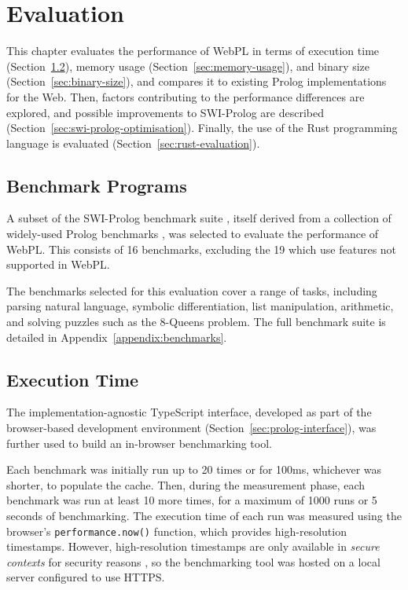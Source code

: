
\chapter{Evaluation}

This chapter evaluates the performance of WebPL in terms of execution time (Section~\ref{sec:execution-time}), memory usage (Section~\ref{sec:memory-usage}), and binary size (Section~\ref{sec:binary-size}), and compares it to existing Prolog implementations for the Web. Then, factors contributing to the performance differences are explored, and possible improvements to SWI-Prolog are described (Section~\ref{sec:swi-prolog-optimisation}). Finally, the use of the Rust programming language is evaluated (Section~\ref{sec:rust-evaluation}).

\section{Benchmark Programs}

A subset of the SWI-Prolog benchmark suite \cite{wielemakerSWIPrologbenchmarksuite2010}, itself derived from a collection of widely-used Prolog benchmarks \cite{haygoodPrologBenchmarkSuite1989}, was selected to evaluate the performance of WebPL. This consists of 16 benchmarks, excluding the 19 which use features not supported in WebPL.

The benchmarks selected for this evaluation cover a range of tasks, including parsing natural language, symbolic differentiation, list manipulation, arithmetic, and solving puzzles such as the 8-Queens problem. The full benchmark suite is detailed in Appendix~\ref{appendix:benchmarks}.

\section{Execution Time}

\label{sec:execution-time}

The implementation-agnostic TypeScript interface, developed as part of the browser-based development environment (Section~\ref{sec:prolog-interface}), was further used to build an in-browser benchmarking tool.

Each benchmark was initially run up to 20 times or for 100ms, whichever was shorter, to populate the cache. Then, during the measurement phase, each benchmark was run at least 10 more times, for a maximum of 1000 runs or 5 seconds of benchmarking. The execution time of each run was measured using the browser's \texttt{performance.now()} function, which provides high-resolution timestamps. However, high-resolution timestamps are only available in \emph{secure contexts} for security reasons \cite{sanchez-rolaClockClockTimeBased2018}, so the benchmarking tool was hosted on a local server configured to use HTTPS.

